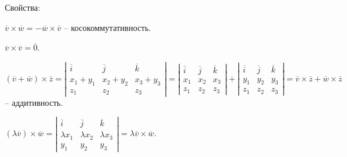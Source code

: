 	  Свойства:
	  \begin{MyList}
		  \item $\overline{v} \times \overline{w} = - \overline{w} \times \overline{v}$ -- косокоммутативность.
		  
		  \item $\overline{v} \times \overline{v} = \overline{0}$.
		  
		  \item $(\overline{v} + \overline{w}) \times \overline{z} = 
			  \left|\begin{array}{cccc}
			  \overline{i} & \overline{j} & \overline{k} \\ 
			  x_1 + y_1 & x_2 + y_2 & x_3 + y_3 \\ 
			  z_1 & z_2 & z_3
			  \end{array}\right| =
			  \left|\begin{array}{cccc}
			  \overline{i} & \overline{j} & \overline{k} \\ 
			  x_1 & x_2 & x_3 \\ 
			  z_1 & z_2 & z_3
			  \end{array}\right| +
			  \left|\begin{array}{cccc}
			  \overline{i} & \overline{j} & \overline{k} \\ 
			  y_1 & y_2 & y_3 \\ 
			  z_1 & z_2 & z_3
			  \end{array}\right| = \overline{v} \times \overline{z} + \overline{w} \times \overline{z}$ -- аддитивность.
		  
		  \item $(\lambda \overline{v}) \times \overline{w} = 
			  \left|\begin{array}{cccc}
			  \overline{i} & \overline{j} & \overline{k} \\ 
			  \lambda x_1 & \lambda x_2 & \lambda x_3 \\ 
			  y_1 & y_2 & y_3
			  \end{array}\right| = \lambda \overline{v} \times \overline{w}$.
  

\end{MyList}
